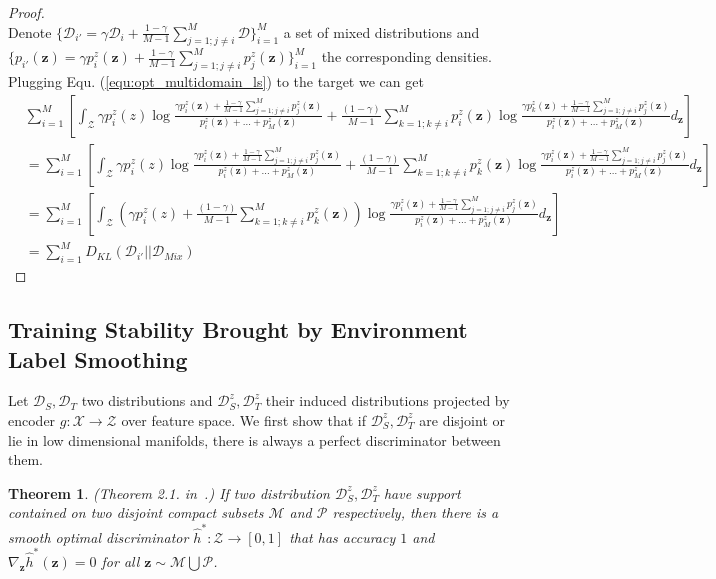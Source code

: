 \documentclass{article} \usepackage{iclr2023_conference,times}
\newtheorem{theo}{Theorem}
\newcommand{\myref}[1]{Equ. (\ref{#1})}
\newcommand{\z}{\mathbf{z}}
\newcommand{\D}{\mathcal{D}}
\begin{document}
\begin{proof}
\begin{equation}
  \label{equ:opt_multidomain_ls}
\end{equation}
Denote $\{\D_{i'}=\gamma \D_i+\frac{1-\gamma}{M-1}\sum^M_{j=1;j\neq i}\D\}_{i=1}^M$ a set of mixed distributions and $\{p_{i'}(\z)=\gamma p_i^z(\z)+\frac{1-\gamma}{M-1}\sum^M_{j=1;j\neq i}p_j^z(\z)\}_{i=1}^M$ the corresponding densities. Plugging \myref{equ:opt_multidomain_ls} to the target we can get
\begin{equation}
\begin{aligned}
&\sum_{i=1}^M\left[\int_\mathcal{Z}  \gamma p_i^z(z)\log \frac{\gamma p_i^z(\z)+\frac{1-\gamma}{M-1}\sum_{j=1;j\neq i}^M p_j^z(\z)}{p_i^z(\z)+\dots+p_M^z(\z)} + 
\frac{(1-\gamma)}{M-1}\sum_{k=1;k\neq i}^M p_i^z(\z)\log \frac{\gamma p_k^z(\z)+\frac{1-\gamma}{M-1}\sum_{j=1;j\neq i}^M p_j^z(\z)}{p_i^z(\z)+\dots+p_M^z(\z)}  d_\z\right]\\
&=\sum_{i=1}^M\left[\int_\mathcal{Z}  \gamma p_i^z(z)\log \frac{\gamma p_i^z(\z)+\frac{1-\gamma}{M-1}\sum_{j=1;j\neq i}^M p_j^z(\z)}{p_i^z(\z)+\dots+p_M^z(\z)} + 
\frac{(1-\gamma)}{M-1}\sum_{k=1;k\neq i}^M p_k^z(\z)\log \frac{\gamma p_i^z(\z)+\frac{1-\gamma}{M-1}\sum_{j=1;j\neq i}^M p_j^z(\z)}{p_i^z(\z)+\dots+p_M^z(\z)}  d_\z\right]\\
&=\sum_{i=1}^M\left[\int_\mathcal{Z}  \left(\gamma p_i^z(z)+\frac{(1-\gamma)}{M-1}\sum_{k=1;k\neq i}^M p_k^z(\z)\right)\log \frac{\gamma p_i^z(\z)+\frac{1-\gamma}{M-1}\sum_{j=1;j\neq i}^M p_j^z(\z)}{p_i^z(\z)+\dots+p_M^z(\z)} d_\z\right]\\
&=\sum_{i=1}^M D_{KL}(\D_{i'}||\D_{Mix})
\end{aligned}\end{equation}
\end{proof}


\subsection{Training Stability Brought by Environment Label Smoothing}\label{sec:app_stable}
Let $\D_S,\D_T$ two distributions and $\D^z_S,\D^z_T$ their induced distributions projected by encoder $g:\mathcal{X}\rightarrow\mathcal{Z}$ over feature space. We first show that if $\D^z_S,\D^z_T$ are disjoint or lie in low dimensional manifolds, there is always a perfect discriminator between them. 

\begin{theo}
(Theorem 2.1. in~\citep{arjovsky2017towards}.) If two distribution $\D^z_S,\D^z_T$ have support contained on two disjoint compact subsets $\mathcal{M}$ and $\mathcal{P}$ respectively, then there is a smooth optimal discriminator  $\hat{h}^*:\mathcal{Z}\rightarrow[0,1]$ that has accuracy $1$ and $\nabla_\z \hat{h}^*(\z)=0$ for all $\z\sim\mathcal{M}\bigcup \mathcal{P}$.
\label{theo:stable1}
\end{theo}
\end{document}

